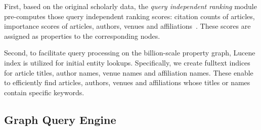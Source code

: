 First, based on the original scholarly data, the {\em query independent ranking} module pre-computes those query independent ranking scores: citation counts of articles, importance scores of articles, authors, venues and affiliations~\cite{ma2018query}. These scores are assigned as properties to the corresponding nodes.


Second, to facilitate query processing on the billion-scale property graph, Lucene index is utilized for initial entity lookups. Specifically, we create fulltext indices for article titles, author names, venue names and affiliation names. These enable to efficiently find articles, authors, venues and affiliations whose titles or names contain specific keywords. %


\subsection{Graph Query Engine } \label{subsec:qe}




